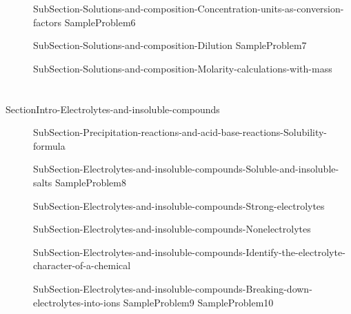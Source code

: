 \documentclass[main.tex]{subfiles} %
\newcommand\chapterlabel{Ch-electrolytes}\setcounter{figurenewcounter}{0}\setcounter{tablenewcounter}{0}\setcounter{formulanewcounter}{0}\chapterpicture{../{\chapterlabel}/figure1}\chapterpicturelabel{PxFuel}
\begin{document}
\begin{description}
\item[]{SubSection-Solutions-and-composition-Concentration-units-as-conversion-factors}
{SampleProblem6}
\item[]{SubSection-Solutions-and-composition-Dilution}
{SampleProblem7}
\item[]{SubSection-Solutions-and-composition-Molarity-calculations-with-mass}

\end{description}










\section{\color{blue!30!black}{Electrolytes and insoluble compounds}}{SectionIntro-Electrolytes-and-insoluble-compounds}
\sloppy \begin{description}
\item[] {SubSection-Precipitation-reactions-and-acid-base-reactions-Solubility-formula}
\item[] {SubSection-Electrolytes-and-insoluble-compounds-Soluble-and-insoluble-salts}
{SampleProblem8}
\vspace{0cm}{Table-Solubility}
\item[]{SubSection-Electrolytes-and-insoluble-compounds-Strong-electrolytes}
\item[]{SubSection-Electrolytes-and-insoluble-compounds-Nonelectrolytes}
\item[]{SubSection-Electrolytes-and-insoluble-compounds-Identify-the-electrolyte-character-of-a-chemical}
 \vspace{1cm}{Table-Electrolytes	}	
\item[]{SubSection-Electrolytes-and-insoluble-compounds-Breaking-down-electrolytes-into-ions}
{SampleProblem9}
{SampleProblem10}
\end{description}
\end{document}

